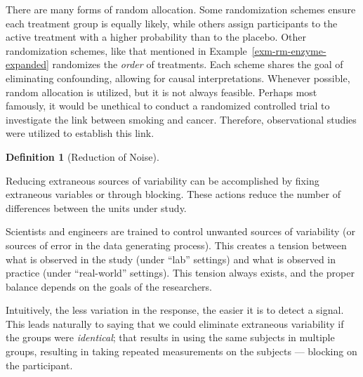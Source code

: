 \documentclass[
  letterpaper,
  DIV=11,
  numbers=noendperiod]{scrreprt}
\theoremstyle{definition}
\newtheorem{definition}{Definition}[chapter]
\theoremstyle{definition}
\theoremstyle{remark}
\begin{document}
There are many forms of random allocation. Some randomization schemes
ensure each treatment group is equally likely, while others assign
participants to the active treatment with a higher probability than to
the placebo. Other randomization schemes, like that mentioned in
Example~\ref{exm-rm-enzyme-expanded} randomizes the \emph{order} of
treatments. Each scheme shares the goal of eliminating confounding,
allowing for causal interpretations. Whenever possible, random
allocation is utilized, but it is not always feasible. Perhaps most
famously, it would be unethical to conduct a randomized controlled trial
to investigate the link between smoking and cancer. Therefore,
observational studies were utilized to establish this link.

\begin{definition}[Reduction of
Noise]\protect\hypertarget{def-noise-reduction}{}\label{def-noise-reduction}

Reducing extraneous sources of variability can be accomplished by fixing
extraneous variables or through blocking. These actions reduce the
number of differences between the units under study.

\end{definition}

\begin{tcolorbox}[enhanced jigsaw, left=2mm, toprule=.15mm, arc=.35mm, breakable, opacitybacktitle=0.6, opacityback=0, rightrule=.15mm, colbacktitle=quarto-callout-note-color!10!white, coltitle=black, leftrule=.75mm, toptitle=1mm, colframe=quarto-callout-note-color-frame, titlerule=0mm, title=\textcolor{quarto-callout-note-color}{\faInfo}\hspace{0.5em}{Tension between Lab Settings and Reality}, bottomrule=.15mm, colback=white, bottomtitle=1mm]

Scientists and engineers are trained to control unwanted sources of
variability (or sources of error in the data generating process). This
creates a tension between what is observed in the study (under ``lab''
settings) and what is observed in practice (under ``real-world''
settings). This tension always exists, and the proper balance depends on
the goals of the researchers.

\end{tcolorbox}

Intuitively, the less variation in the response, the easier it is to
detect a signal. This leads naturally to saying that we could eliminate
extraneous variability if the groups were \emph{identical}; that results
in using the same subjects in multiple groups, resulting in taking
repeated measurements on the subjects --- blocking on the participant.
\end{document}
